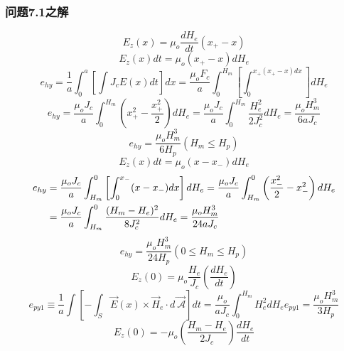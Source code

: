 \subsubsection{问题7.1之解}
\begin{equation}%
E_z(x)=\mu_o\frac{dH_e}{dt}(x_+-x)
\end{equation}
\begin{equation}%
E_z(x)dt=\mu_o(x_+-x)dH_e
\end{equation}
\begin{equation}%
e_{hy}=\frac{1}{a}\int_{0}^{a}\left[\int J_cE(x)dt\right]dx 
=\frac{\mu_oF_c}{a}\int_{0}^{H_m}\left[\int_{0}^{x_+(x_+-x)dx}\right]dH_e
\end{equation}
\begin{equation}%
e_{hy}=\frac{\mu_oJ_c}{a}\int_{0}^{H_m}\left(x_{+}^{2}-\frac{x_{+}^{2}}{2}\right)dH_e 
=\frac{\mu_oJ_c}{a}\int_{0}^{H_m}\frac{H_{e}^{2}}{2J_{c}^{2}}dH_e=\frac{\mu_oH_{m}^{3}}{6aJ_c}
\end{equation}
\begin{equation}%
e_{hy}=\frac{\mu_oH_{m}^{3}}{6H_p}    (H_m\leq H_p)
\end{equation}
\begin{equation}%
E_z(x)dt=\mu_o(x-x_-)dH_e
\end{equation}
\begin{align*}%
e_{hy}&=\frac{\mu_oJ_c}{a}\int_{H_m}^{0}\left[\int_{0}^{x_-}(x-x_-)dx\right]dH_e=\frac{\mu_oJ_c}{a}\int_{H_m}^{0}\left(\frac{x_{-}^{2}}{2}-x_{-}^{2}\right)dH_e \\\notag
&=\frac{\mu_oJ_c}{a}\int_{H_m}^{0}\frac{(H_m-H_e)^2}{8J_{c}^{2}}dH_e=\frac{\mu_oH_{m}^{3}}{24aJ_c}
\end{align*}
\begin{equation}%
e_{hy}=\frac{\mu_oH_{m}^{3}}{24H_p}       (0\leq H_m\leq H_p)
\end{equation}
\begin{equation}%
E_z(0)=\mu_o\frac{H_e}{J_c}\left(\frac{dH_e}{dt}\right)
\end{equation}
\begin{equation}%
e_{py1}\equiv\frac{1}{a}\int\left[-\int_{S}\vec{E}(x)\times\vec{H}_e\cdot d\vec{\ \mathcal{A}}\right]dt=\frac{\mu_o}{aJ_c}\int_{0}^{H_m}H_{e}^{2}dH_e
e_{py1}=\frac{\mu_oH_{m}^{3}}{3H_p}
\end{equation}
\begin{equation}%
E_z(0)=-\mu_o\left(\frac{H_m-H_e}{2J_c}\right)\frac{dH_e}{dt}
\end{equation}
